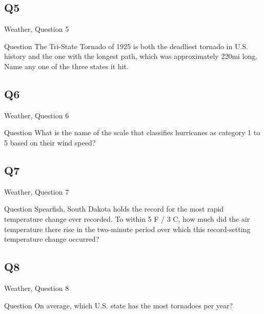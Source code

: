 \documentclass[11pt]{beamer}
\begin{document}
\subsection*{Q5}
\begin{frame}[t]{Weather, Question 5}
\begin{block}{Question}
The Tri-State Tornado of 1925 is both the deadliest tornado in U.S. history and the one with the longest path, which was approximately 220mi long. Name any one of the three states it hit.
\end{block}
\end{frame}
\subsection*{Q6}
\begin{frame}[t]{Weather, Question 6}
\begin{block}{Question}
What is the name of the scale that classifies hurricanes as category 1 to 5 based on their wind speed?
\end{block}
\end{frame}
\subsection*{Q7}
\begin{frame}[t]{Weather, Question 7}
\begin{block}{Question}
Spearfish, South Dakota holds the record for the most rapid temperature change ever recorded. To within 5 \textdegree{}F / 3 \textdegree{}C, how much did the air temperature there rise in the two-minute period over which this record-setting temperature change occurred?
\end{block}
\end{frame}
\subsection*{Q8}
\begin{frame}[t]{Weather, Question 8}
\begin{block}{Question}
On average, which U.S. state has the most tornadoes per year?
\end{block}
\end{frame}
\end{document}

